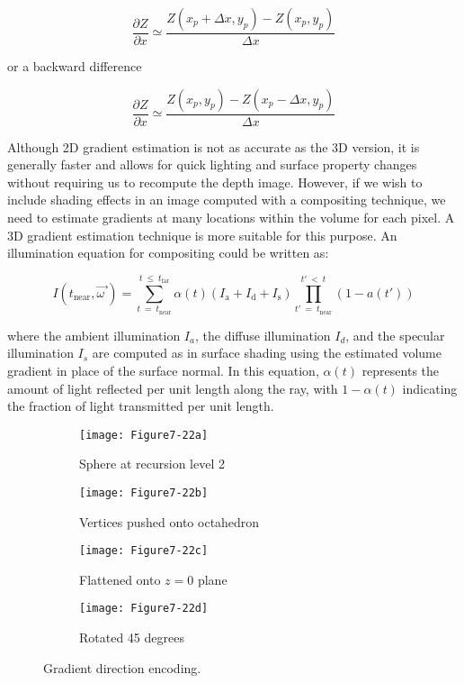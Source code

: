 \begin{equation}\label{eq:7.10}
\dfrac{\partial Z}{\partial x} \simeq \dfrac{Z(x_p + \Delta x, y_p) - Z(x_p, y_p)}{\Delta x}
\end{equation}

or a backward difference

\begin{equation}\label{eq:7.11}
\dfrac{\partial Z}{\partial x} \simeq \dfrac{Z(x_p, y_p) - Z(x_p - \Delta x, y_p)}{\Delta x}
\end{equation}

Although 2D gradient estimation is not as accurate as the 3D version, it is generally faster and allows for quick lighting and surface property changes without requiring us to recompute the depth image. However, if we wish to include shading effects in an image computed with a compositing technique, we need to estimate gradients at many locations within the volume for each pixel. A 3D gradient estimation technique is more suitable for this purpose. An illumination equation for compositing could be written as:

\begin{equation}\label{eq:7.12}
I(t_\text{near}, \overrightarrow{\omega\ }) =  \sum_{t\ =\ t_\text{near}}^{t\ \leq\ t_\text{far}} \alpha(t)\left(I_\text{a} + I_\text{d} + I_\text{s}\right) \prod_{t'\ =\ t_\text{near}}^{t'\ <\ t}\left(1 - a(t') \right)
\end{equation}

where the ambient illumination $I_a$, the diffuse illumination $I_d$, and the specular illumination $I_s$ are computed as in surface shading using the estimated volume gradient in place of the surface normal. In this equation, $\alpha(t)$ represents the amount of light reflected per unit length along the ray, with $1 - \alpha(t)$ indicating the fraction of light transmitted per unit length.

\begin{figure}[!htb]
	\begin{subfigure}[h]{0.48\linewidth}
		\texttt{[image: Figure7-22a]}
		\caption*{Sphere at recursion level 2}\label{fig:Figure7-22a}
	\end{subfigure}
	\hfill
	\begin{subfigure}[h]{0.48\linewidth}
		\texttt{[image: Figure7-22b]}
		\caption*{Vertices pushed onto octahedron}\label{fig:Figure7-22b}
	\end{subfigure}%
	\hfill
	\begin{subfigure}[h]{0.48\linewidth}
		\texttt{[image: Figure7-22c]}
		\caption*{Flattened onto $z = 0$ plane}\label{fig:Figure7-22c}
	\end{subfigure}%
	\hfill
	\begin{subfigure}[h]{0.48\linewidth}
		\texttt{[image: Figure7-22d]}
		\caption*{Rotated 45 degrees}\label{fig:Figure7-22d}
	\end{subfigure}%
	\caption{Gradient direction encoding.}\label{fig:Figure7-22}
\end{figure}



